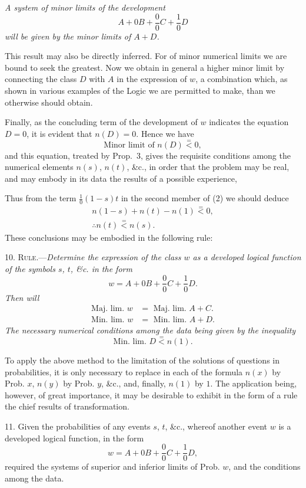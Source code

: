 \documentclass[oneside]{book}
\begin{document}
\emph{A system of minor limits of the development
\[
  A + 0B + \frac{0}{0}C + \frac{1}{0}D
\]
will be given by the minor limits of $A + D$.}

This result may also be directly inferred. For of minor numerical
limits we are bound to seek the greatest. Now we obtain
in general a higher minor limit by connecting the class $D$
with $A$ in the expression of $w$, a combination which, as shown in
various examples of the Logic we are permitted to make, than
we otherwise should obtain.

Finally, as the concluding term of the development of $w$ indicates the equation $D = 0$, it is evident that $n(D) = 0$. Hence
we have
\[
  \text{Minor limit of } n(D) \stackrel{=}{<} 0,
\]
and this equation, treated by Prop.~3, gives the requisite conditions among the numerical elements $n(s)$, $n(t)$, \&c., in order that
the problem may be real, and may embody in its data the results of a possible experience,

Thus from the term $\frac{1}{0}(1-s)t$ in the second member of (2)
we should deduce
\begin{gather*}
  n(1-s) + n(t) - n(1) \stackrel{=}{<} 0,   \\
  \therefore n(t) \stackrel{=}{<}  n(s).
\end{gather*}
These conclusions may be embodied in the following rule:

10. \textsc{Rule.}---\emph{Determine the expression of the class $w$ as a developed logical function of the symbols $s$, $t$, \&c. in the form}
\[
  w = A + 0B + \frac{0}{0}C + \frac{1}{0}D.
\]
\emph{Then will}
\begin{align*}
  \text{Maj. lim. } w &= \text{ Maj. lim. } A + C.   \\
  \text{Min. lim. } w &= \text{ Min. lim. } A + D.
\end{align*}
\emph{The necessary numerical conditions among the data being given by
the inequality}
\[
  \text{Min. lim. } D \stackrel{=}{<} n(1).
\]

To apply the above method to the limitation of the solutions
of questions in probabilities, it is only necessary to replace in
each of the formula $n(x)$ by Prob. $x$, $n(y)$ by Prob. $y$, \&c., and,
finally, $n(1)$ by $1$. The application being, however, of great importance,
it may be desirable to exhibit in the form of a rule
the chief results of transformation.

11. Given the probabilities of any events $s$, $t$, \&c., whereof
another event $w$ is a developed logical function, in the form
\[
  w = A + 0B + \frac{0}{0}C + \frac{1}{0}D,
\]
required the systems of superior and inferior limits of Prob. $w$,
and the conditions among the data.
\end{document}
